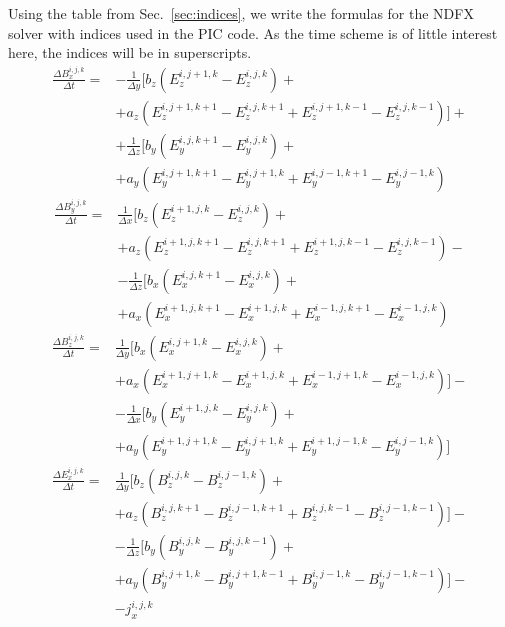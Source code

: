 \documentclass[12pt,a4paper,DIV=calc]{scrartcl}
\begin{document}
Using the table from Sec.~\ref{sec:indices}, we write the formulas for the NDFX solver with indices used in the PIC code.
As the time scheme is of little interest here, the indices will be in superscripts. 
\begin{align}
    \frac{\Delta B_x^{i,j,k}}{\Delta t} = &-\frac{1}{\Delta y}\big[b_z \left(E_z^{i,j+1,k} - E_z^{i,j,k} \right) + \nonumber \\
    &+a_z \left(E_z^{i,j+1,k+1} - E_z^{i,j,k+1} + E_z^{i,j+1,k-1} - E_z^{i,j,k-1}\right)\big] + \nonumber \\
    &+\frac{1}{\Delta z} \big[b_y \left(E_y^{i,j,k+1} - E_y^{i,j,k}\right) + \nonumber \\
    &+a_y \left(E_y^{i,j+1,k+1}-E_y^{i,j+1,k} + E_y^{i,j-1,k+1} - E_y^{i,j-1,k}\right)
\end{align}
\begin{align}
    \frac{\Delta B_y^{i,j,k}}{\Delta t} = &\frac{1}{\Delta x}\big[b_z \left(E_z^{i+1,j,k} - E_z^{i,j,k} \right) + \nonumber \\
    &+a_z \left(E_z^{i+1,j,k+1} - E_z^{i,j,k+1} + E_z^{i+1,j,k-1} - E_z^{i,j,k-1}\right) - \nonumber \\
    &-\frac{1}{\Delta z} \big[ b_x \left(E_x^{i,j,k+1} - E_x^{i,j,k}\right) + \nonumber \\
    &+a_x \left(E_x^{i+1,j,k+1} - E_x^{i+1,j,k} + E_x^{i-1,j,k+1} - E_x^{i-1,j,k}\right)
\end{align}
\begin{align}
    \frac{\Delta B_z^{i,j,k}}{\Delta t} = &\frac{1}{\Delta y}\big[b_x\left(E_x^{i,j+1,k} - E_x^{i,j,k} \right) + \nonumber \\
    &+a_x \left(E_x^{i+1,j+1,k} - E_x^{i+1,j,k} + E_x^{i-1,j+1,k} - E_x^{i-1,j,k}\right) \big] - \nonumber \\
    &-\frac{1}{\Delta x} \big[ b_y \left(E_y^{i+1,j,k} - E_y^{i,j,k}\right) + \nonumber \\
    &+a_y \left(E_y^{i+1,j+1,k} - E_y^{i,j+1,k} + E_y^{i+1,j-1,k} - E_y^{i,j-1,k} \right) \big]
\end{align}
\begin{align}
    \frac{\Delta E_x^{i,j,k}}{\Delta t} = &\frac{1}{\Delta y}\big[b_z \left(B_z^{i,j,k} - B_z^{i,j-1,k} \right) + \nonumber\\
    &+ a_z \left(B_z^{i,j,k+1} - B_z^{i,j-1,k+1} + B_z^{i,j,k-1} - B_z^{i,j-1,k-1}\right) \big] - \nonumber\\
    &- \frac{1}{\Delta z}\big[ b_y \left(B_y^{i,j,k}-B_y^{i,j,k-1}\right) + \nonumber\\
    &+ a_y \left(B_y^{i,j+1,k} - B_y^{i,j+1,k-1} + B_y^{i,j-1,k} - B_y^{i,j-1,k-1}\right) \big] - \nonumber\\
    &- j_x^{i,j,k}
\end{align}
\end{document}
